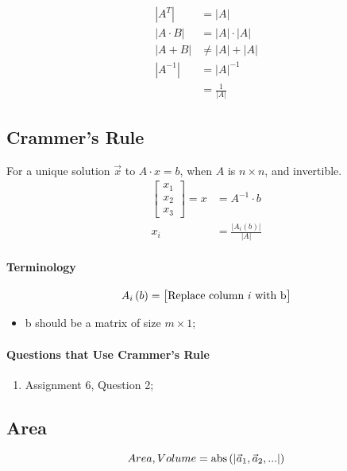   \begin{align*}
    \left| A^{T} \right| &= \left| A \right| \\ 
    \left| A \cdot B \right| &= \left| A \right| \cdot \left| A \right| \\ 
    \left| A + B \right| &\ne \left| A \right| + \left| A \right| \\ 
    \left| A^{-1} \right| &= \left| A \right|^{-1} \\
    &= \frac{1}{\left| A \right|}
  \end{align*}

  \subsection{Crammer's Rule}
  
    \begin{definition}
      For a unique solution $ \vec{x} $ to $ A \cdot x = b $, when $ A $ 
      is $ n \times n $, and invertible.
      \begin{align}
        \begin{bmatrix}
          x_{1} \\ 
          x_{2} \\ 
          x_{3}
        \end{bmatrix}
        = x &= A^{-1} \cdot b \\
        x_{i} &= \frac{ \left| A_{i} \left( b \right) \right| }{ \left| A \right| }
      \end{align}  
    \end{definition}
  
    \paragraph{Terminology}
    \begin{equation}
      A_{i} \left( b \right) = 
      \begin{bmatrix}
        \text{Replace column $ i $ with b}
      \end{bmatrix}
    \end{equation}
    
    \begin{itemize}
      \item b should be a matrix of size $ m \times 1 $;
    \end{itemize}
    
    \paragraph{Questions that Use Crammer's Rule}
    \begin{enumerate}
      \item Assignment 6, Question 2;
    \end{enumerate}
    
  \subsection{Area}
  
    \begin{equation}
      Area, Volume = \operatorname{abs} \left( \left| \vec{a}_{1}, \vec{a}_{2}, ... \right| \right)
    \end{equation}